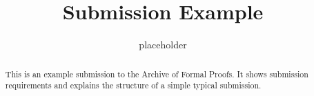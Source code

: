 \documentclass[11pt, a4paper]{report}
\begin{document}
\title{Submission Example}
\author{placeholder}
\maketitle

\begin{abstract}
  This is an example submission to the Archive of Formal Proofs. It
  shows submission requirements and explains the structure of a simple
  typical submission.
\end{abstract}

\tableofcontents



% 
% 
\end{document}
